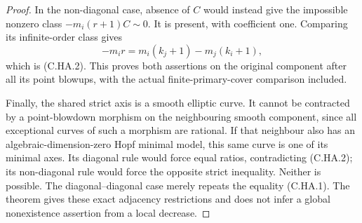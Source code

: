 \begin{proof}
In the non-diagonal case, absence of $C$ would instead
give the impossible nonzero class $-m_i(r+1)C\sim0$.
It is present, with coefficient one. Comparing its
infinite-order class gives
\[
       -m_i r=m_i(k_j+1)-m_j(k_i+1),
\tag{C.HA.6}
\]
which is (C.HA.2). This proves both assertions on the
original component after all its point blowups, with
the actual finite-primary-cover comparison included.

Finally, the shared strict axis is a smooth elliptic
curve. It cannot be contracted by a point-blowdown
morphism on the neighbouring smooth component, since
all exceptional curves of such a morphism are rational.
If that neighbour also has an algebraic-dimension-zero
Hopf minimal model, this same curve is one of its
minimal axes. Its diagonal rule would force equal
ratios, contradicting (C.HA.2); its non-diagonal rule
would force the opposite strict inequality. Neither
is possible. The diagonal--diagonal case merely repeats
the equality (C.HA.1). The theorem gives these exact
adjacency restrictions and does not infer a global
nonexistence assertion from a local decrease.
\end{proof}
